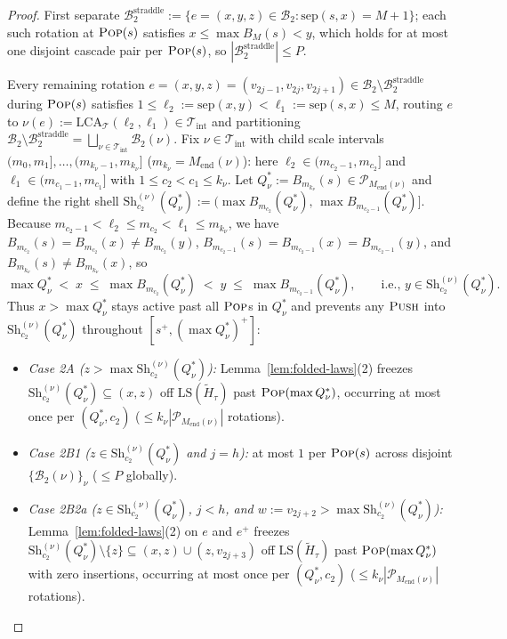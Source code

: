 \documentclass[11pt]{article}
\theoremstyle{definition}
\theoremstyle{remark}
\newcommand{\LS}{\mathrm{LS}}
\newcommand{\LCA}{\mathrm{LCA}}
\newcommand{\sep}{\mathrm{sep}}
\newcommand{\PUSH}{\textnormal{\scshape Push}}
\newcommand{\POP}{\textnormal{\scshape Pop}}
\begin{document}
\begin{proof}
First separate $\mathcal{B}_2^{\mathrm{straddle}} := \{e = (x, y, z) \in \mathcal{B}_2 : \sep(s, x) = M + 1\}$; each such rotation at $\POP(s)$ satisfies $x \le \max B_M(s) < y$, which holds for at most one disjoint cascade pair per $\POP(s)$, so $|\mathcal{B}_2^{\mathrm{straddle}}| \le P$.

Every remaining rotation $e = (x, y, z) = (v_{2j-1}, v_{2j}, v_{2j+1}) \in \mathcal{B}_2 \setminus \mathcal{B}_2^{\mathrm{straddle}}$ during $\POP(s)$ satisfies $1 \le \ell_2 := \sep(x, y) < \ell_1 := \sep(s, x) \le M$, routing $e$ to $\nu(e) := \LCA_{\mathcal{T}}(\ell_2, \ell_1) \in \mathcal{T}_{\mathrm{int}}$ and partitioning $\mathcal{B}_2 \setminus \mathcal{B}_2^{\mathrm{straddle}} = \bigsqcup_{\nu \in \mathcal{T}_{\mathrm{int}}} \mathcal{B}_2(\nu)$. Fix $\nu \in \mathcal{T}_{\mathrm{int}}$ with child scale intervals $(m_0, m_1], \dots, (m_{k_\nu - 1}, m_{k_\nu}]$ ($m_{k_\nu} = M_{\mathrm{end}}(\nu)$): here $\ell_2 \in (m_{c_2 - 1}, m_{c_2}]$ and $\ell_1 \in (m_{c_1 - 1}, m_{c_1}]$ with $1 \le c_2 < c_1 \le k_\nu$. Let $Q^*_\nu := B_{m_{k_\nu}}(s) \in \mathcal{P}_{M_{\mathrm{end}}(\nu)}$ and define the right shell $\mathrm{Sh}_{c_2}^{(\nu)}(Q^*_\nu) := \big(\max B_{m_{c_2}}(Q^*_\nu),\, \max B_{m_{c_2 - 1}}(Q^*_\nu)\big]$. Because $m_{c_2 - 1} < \ell_2 \le m_{c_2} < \ell_1 \le m_{k_\nu}$, we have $B_{m_{c_2}}(s) = B_{m_{c_2}}(x) \ne B_{m_{c_2}}(y)$, $B_{m_{c_2 - 1}}(s) = B_{m_{c_2 - 1}}(x) = B_{m_{c_2 - 1}}(y)$, and $B_{m_{k_\nu}}(s) \ne B_{m_{k_\nu}}(x)$, so
\[
\max Q^*_\nu \;<\; x \;\le\; \max B_{m_{c_2}}(Q^*_\nu) \;<\; y \;\le\; \max B_{m_{c_2 - 1}}(Q^*_\nu), \qquad \text{i.e., } y \in \mathrm{Sh}_{c_2}^{(\nu)}(Q^*_\nu).
\]
Thus $x > \max Q^*_\nu$ stays active past all $\POP$s in $Q^*_\nu$ and prevents any $\PUSH$ into $\mathrm{Sh}_{c_2}^{(\nu)}(Q^*_\nu)$ throughout $[s^+, (\max Q^*_\nu)^+]$:
\begin{itemize}[leftmargin=2em]
  \item \emph{Case 2A ($z > \max \mathrm{Sh}_{c_2}^{(\nu)}(Q^*_\nu)$):} Lemma~\ref{lem:folded-laws}(2) freezes $\mathrm{Sh}_{c_2}^{(\nu)}(Q^*_\nu) \subseteq (x, z)$ off $\LS(\widetilde{H}_\tau)$ past $\POP(\max Q^*_\nu)$, occurring at most once per $(Q^*_\nu, c_2)$ ($\le k_\nu |\mathcal{P}_{M_{\mathrm{end}}(\nu)}|$ rotations).
  \item \emph{Case 2B1 ($z \in \mathrm{Sh}_{c_2}^{(\nu)}(Q^*_\nu)$ and $j = h$):} at most $1$ per $\POP(s)$ across disjoint $\{\mathcal{B}_2(\nu)\}_\nu$ ($\le P$ globally).
  \item \emph{Case 2B2a ($z \in \mathrm{Sh}_{c_2}^{(\nu)}(Q^*_\nu)$, $j < h$, and $w := v_{2j+2} > \max \mathrm{Sh}_{c_2}^{(\nu)}(Q^*_\nu)$):} Lemma~\ref{lem:folded-laws}(2) on $e$ and $e^+$ freezes $\mathrm{Sh}_{c_2}^{(\nu)}(Q^*_\nu) \setminus \{z\} \subseteq (x, z) \cup (z, v_{2j+3})$ off $\LS(\widetilde{H}_\tau)$ past $\POP(\max Q^*_\nu)$ with zero insertions, occurring at most once per $(Q^*_\nu, c_2)$ ($\le k_\nu |\mathcal{P}_{M_{\mathrm{end}}(\nu)}|$ rotations).

\end{itemize}
\end{proof}
\end{document}
